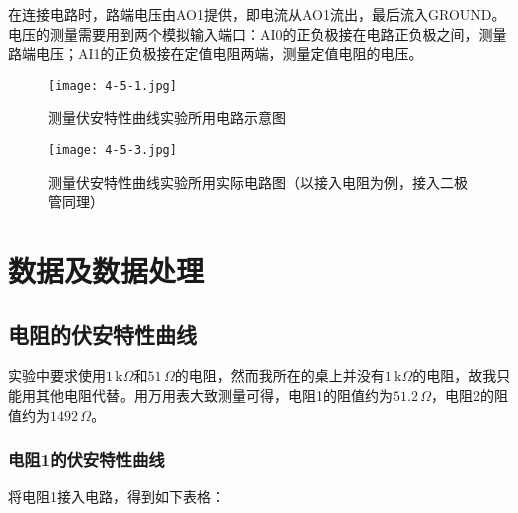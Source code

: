 \documentclass[12pt]{article}
\begin{document}
在连接电路时，路端电压由AO1提供，即电流从AO1流出，最后流入GROUND。电压的测量需要用到两个模拟输入端口：AI0的正负极接在电路正负极之间，测量路端电压；AI1的正负极接在定值电阻两端，测量定值电阻的电压。

\begin{figure}[htbp]
    \centering
    \texttt{[image: 4-5-1.jpg]}
    \caption{测量伏安特性曲线实验所用电路示意图}
\end{figure}

\begin{figure}[htbp]
    \centering
    \texttt{[image: 4-5-3.jpg]}
    \caption{测量伏安特性曲线实验所用实际电路图（以接入电阻为例，接入二极管同理）}
\end{figure}


\section{数据及数据处理}

\subsection{电阻的伏安特性曲线}
实验中要求使用$1\,\mathrm{k}\Omega$和$51\,\Omega$的电阻，然而我所在的桌上并没有$1\,\mathrm{k}\Omega$的电阻，故我只能用其他电阻代替。用万用表大致测量可得，电阻1的阻值约为$51.2\,\Omega$，电阻2的阻值约为$1492\,\Omega$。

\subsubsection{电阻1的伏安特性曲线}
将电阻1接入电路，得到如下表格：
\end{document}
